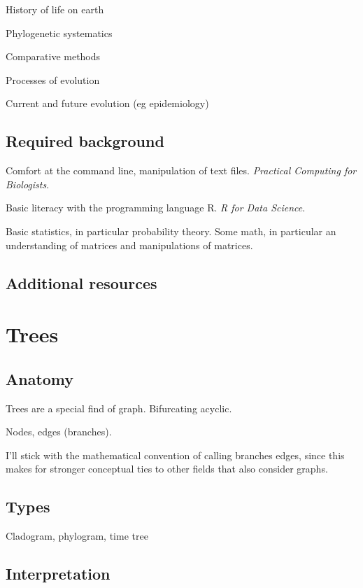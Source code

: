 \documentclass[
]{book}
\begin{document}
History of life on earth

Phylogenetic systematics

Comparative methods

Processes of evolution

Current and future evolution (eg epidemiology)

\hypertarget{required-background}{%
\section{Required background}\label{required-background}}

Comfort at the command line, manipulation of text files. \emph{Practical Computing for Biologists}.

Basic literacy with the programming language R. \emph{R for Data Science}.

Basic statistics, in particular probability theory. Some math, in particular an understanding of matrices and manipulations of matrices.

\hypertarget{additional-resources}{%
\section{Additional resources}\label{additional-resources}}

\hypertarget{trees}{%
\chapter{Trees}\label{trees}}

\hypertarget{anatomy}{%
\section{Anatomy}\label{anatomy}}

Trees are a special find of graph. Bifurcating acyclic.

Nodes, edges (branches).

I'll stick with the mathematical convention of calling branches edges, since this makes for stronger conceptual ties to other fields that also consider graphs.

\hypertarget{types}{%
\section{Types}\label{types}}

Cladogram, phylogram, time tree

\hypertarget{interpretation}{%
\section{Interpretation}\label{interpretation}}
\end{document}
